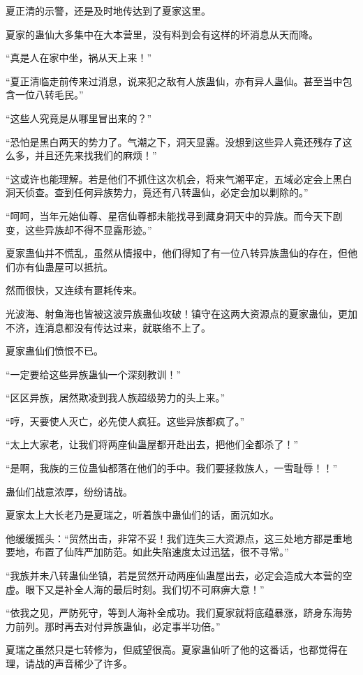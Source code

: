 \begin{this_body}
夏正清的示警，还是及时地传达到了夏家这里。

夏家的蛊仙大多集中在大本营里，没有料到会有这样的坏消息从天而降。

“真是人在家中坐，祸从天上来！”

“夏正清临走前传来过消息，说来犯之敌有人族蛊仙，亦有异人蛊仙。甚至当中包含一位八转毛民。”

“这些人究竟是从哪里冒出来的？”

“恐怕是黑白两天的势力了。气潮之下，洞天显露。没想到这些异人竟还残存了这么多，并且还先来找我们的麻烦！”

“这或许也能理解。若是他们不抓住这次机会，将来气潮平定，五域必定会上黑白洞天侦查。查到任何异族势力，竟还有八转蛊仙，必定会加以剿除的。”

“呵呵，当年元始仙尊、星宿仙尊都未能找寻到藏身洞天中的异族。而今天下剧变，这些异族却不得不显露形迹。”

夏家蛊仙并不慌乱，虽然从情报中，他们得知了有一位八转异族蛊仙的存在，但他们亦有仙蛊屋可以抵抗。

然而很快，又连续有噩耗传来。

光波海、射鱼海也皆被这波异族蛊仙攻破！镇守在这两大资源点的夏家蛊仙，更加不济，连消息都没有传达过来，就联络不上了。

夏家蛊仙们愤恨不已。

“一定要给这些异族蛊仙一个深刻教训！”

“区区异族，居然欺凌到我人族超级势力的头上来。”

“哼，天要使人灭亡，必先使人疯狂。这些异族都疯了。”

“太上大家老，让我们将两座仙蛊屋都开赴出去，把他们全都杀了！”

“是啊，我族的三位蛊仙都落在他们的手中。我们要拯救族人，一雪耻辱！！”

蛊仙们战意浓厚，纷纷请战。

夏家太上大长老乃是夏瑞之，听着族中蛊仙们的话，面沉如水。

他缓缓摇头：“贸然出击，非常不妥！我们连失三大资源点，这三处地方都是重地要地，布置了仙阵严加防范。如此失陷速度太过迅猛，很不寻常。”

“我族并未八转蛊仙坐镇，若是贸然开动两座仙蛊屋出去，必定会造成大本营的空虚。眼下又是补全人海的最后时刻。我们切不可麻痹大意！”

“依我之见，严防死守，等到人海补全成功。我们夏家就将底蕴暴涨，跻身东海势力前列。那时再去对付异族蛊仙，必定事半功倍。”

夏瑞之虽然只是七转修为，但威望很高。夏家蛊仙听了他的这番话，也都觉得在理，请战的声音稀少了许多。


\end{this_body}
